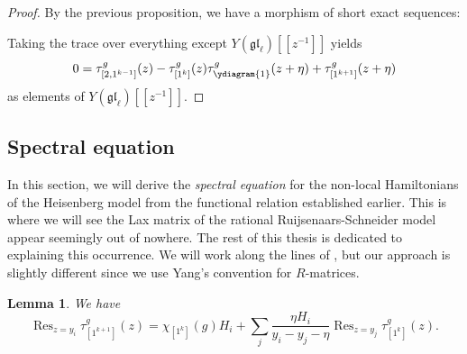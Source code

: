 \documentclass[11pt]{report}
\newtheorem{lemma}[theorem]{Lemma}
\theoremstyle{definition}
\theoremstyle{remark}
\theoremstyle{remark}
\begin{document}
\begin{proof}
By the previous proposition, we have a morphism of short exact sequences: \\
{\small
{}
}
Taking the trace over everything except $Y(\mathfrak{gl}_\ell)[[z^{-1}]]$ yields
\begin{equation*}
0 = \tau_{[2,1^{k-1}]}^g(z) - \tau_{[1^k]}^g(z) \tau_{\ydiagram{1}}^g(z+\eta) + \tau_{[1^{k+1}]}^g(z+\eta)
\end{equation*}
as elements of $Y(\mathfrak{gl}_\ell)[[z^{-1}]]$.
\end{proof}

\subsection{Spectral equation}

In this section, we will derive the \emph{spectral equation} for the non-local Hamiltonians of the Heisenberg model from the functional relation established earlier. This is where we will see the Lax matrix of the rational Ruijsenaars-Schneider model appear seemingly out of nowhere. The rest of this thesis is dedicated to explaining this occurrence. We will work along the lines of \cite{book:arutyunov:betheAnsatz}, but our approach is slightly different since we use Yang's convention for $R$-matrices.

\begin{lemma}
We have
\begin{equation*}
\operatorname{Res}_{z=y_i} \tau_{[1^{k+1}]}^g(z)
= \chi_{[1^k]}(g) H_i + \sum_j \frac{\eta H_i}{y_i-y_j-\eta} \operatorname{Res}_{z=y_j} \tau_{[1^k]}^g(z).
\end{equation*}
\end{lemma}
\end{document}
